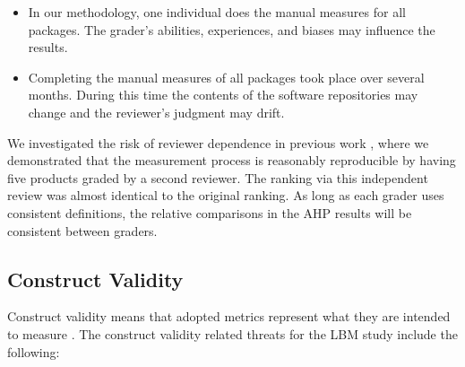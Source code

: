 \documentclass[final, 3p, times, authoryear]{elsarticle}
\begin{document}
\begin{itemize}
\item In our methodology, one individual does the manual measures for all
packages. The grader's abilities, experiences, and biases may influence the
results.  
\item Completing the manual measures of all packages took place over several
months. During this time the contents of the software repositories may change
and the reviewer's judgment may drift.
\end{itemize}

We investigated the risk of reviewer dependence in previous work
\citep{SmithEtAl2016}, where we demonstrated that the measurement process is
reasonably reproducible by having five products graded by a second reviewer. The
ranking via this independent review was almost identical to the original
ranking. As long as each grader uses consistent definitions, the relative
comparisons in the AHP results will be consistent between graders.

\subsection{Construct Validity}

Construct validity means that adopted metrics represent what they are intended
to measure \citep{AmpatzoglouEtAl2019}. The construct validity related threats
for the LBM study include the following:
\end{document}
